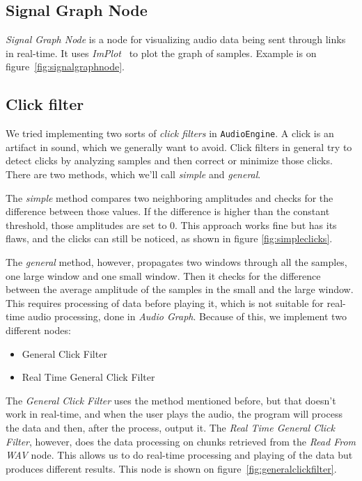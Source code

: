 \documentclass[conference]{IEEEtran}
\begin{document}
\subsection{Signal Graph Node}
\textit{Signal Graph Node} is a node for visualizing audio data being sent through links in real-time. It uses \textit{ImPlot}~\cite{implot} to plot the graph of samples. Example is on figure~\ref{fig:signalgraphnode}.

\subsection{Click filter}
We tried implementing two sorts of \textit{click filters} in \texttt{AudioEngine}. A click is an artifact in sound, which we generally want to avoid. Click filters in general try to detect clicks by analyzing samples and then correct or minimize those clicks. There are two methods, which we'll call \textit{simple} and \textit{general}.

The \textit{simple} method compares two neighboring amplitudes and checks for the difference between those values. If the difference is higher than the constant threshold, those amplitudes are set to 0. This approach works fine but has its flaws, and the clicks can still be noticed, as shown in figure \ref{fig:simpleclicks}.

The \textit{general} method, however, propagates two windows through all the samples, one large window and one small window. Then it checks for the difference between the average amplitude of the samples in the small and the large window. This requires processing of data before playing it, which is not suitable for real-time audio processing, done in \textit{Audio Graph}. Because of this, we implement two different nodes:
\begin{itemize}
    \item General Click Filter
    \item Real Time General Click Filter
\end{itemize}
The \textit{General Click Filter} uses the method mentioned before, but that doesn't work in real-time, and when the user plays the audio, the program will process the data and then, after the process, output it. The \textit{Real Time General Click Filter}, however, does the data processing on chunks retrieved from the \textit{Read From WAV} node. This allows us to do real-time processing and playing of the data but produces different results. This node is shown on figure~\ref{fig:generalclickfilter}.
\end{document}
